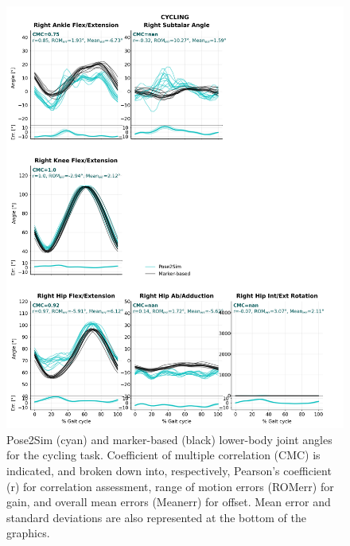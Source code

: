 \begin{figure}[!ht]
	\centering
	\def\svgwidth{1\columnwidth}
	\fontsize{10pt}{10pt}\selectfont
	\includegraphics[height=\dimexpr\textheight-119pt]{"../Annexes/Figures/Fig_QTMBike.png"}
	\caption{Pose2Sim (cyan) and marker-based (black) lower-body joint angles for the cycling task. Coefficient of multiple correlation (CMC) is indicated, and broken down into, respectively, Pearson’s coefficient (r) for correlation assessment, range of motion errors (ROMerr) for gain, and overall mean errors (Meanerr) for offset. Mean error and standard deviations are also represented at the bottom of the graphics.}
	\label{fig_qtmbike}
\end{figure}

